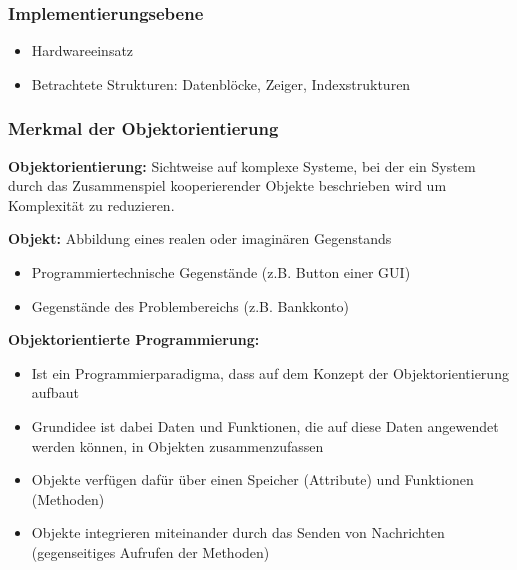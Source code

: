 \documentclass[a4paper]{article}
\begin{document}
			\subsubsection{Implementierungsebene}
			\begin{itemize}
				\item Hardwareeinsatz
				\item Betrachtete Strukturen: Datenblöcke, Zeiger, Indexstrukturen
			\end{itemize}
			
			\hrulefill
			
			\subsubsection{Merkmal der Objektorientierung}
			\textbf{Objektorientierung:} Sichtweise auf komplexe Systeme, bei der ein System durch das Zusammenspiel kooperierender Objekte beschrieben wird um Komplexität zu reduzieren. \bigskip %
			
			
			\textbf{Objekt:} Abbildung eines realen oder imaginären Gegenstands
			\begin{itemize}
				\item Programmiertechnische Gegenstände (z.B. Button einer GUI)
				\item Gegenstände des Problembereichs (z.B. Bankkonto)
			\end{itemize} \bigskip
			
			\textbf{Objektorientierte Programmierung:}
			\begin{itemize}
				\item Ist ein Programmierparadigma, dass auf dem Konzept der Objektorientierung aufbaut
				\item Grundidee ist dabei Daten und Funktionen, die auf diese Daten angewendet werden können, in Objekten zusammenzufassen 
				\item Objekte verfügen dafür über einen Speicher (Attribute) und Funktionen (Methoden)
				\item Objekte integrieren miteinander durch das Senden von Nachrichten (gegenseitiges Aufrufen der Methoden)
			\end{itemize}
			
			\pagebreak
			
\end{document}
